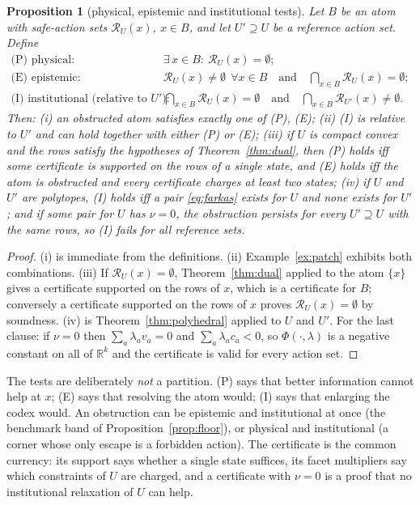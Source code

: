 \documentclass[11pt,a4paper]{article}
\theoremstyle{plain}
\newtheorem{proposition}[theorem]{Proposition}
\theoremstyle{definition}
\theoremstyle{remark}
\newcommand{\R}{\mathbb{R}}
\newcommand{\calR}{\mathcal{R}}
\begin{document}
\begin{proposition}[physical, epistemic and institutional tests]\label{prop:taxonomy}
Let $B$ be an atom with safe-action sets $\calR_U(x)$, $x\in B$, and let $U'\supseteq U$ be a reference action set. Define
\begin{align*}
\text{(P) physical:}\quad&\exists\,x\in B:\ \calR_U(x)=\emptyset;\\
\text{(E) epistemic:}\quad&\calR_U(x)\neq\emptyset\ \ \forall x\in B\quad\text{and}\quad\bigcap_{x\in B}\calR_U(x)=\emptyset;\\
\text{(I) institutional (relative to $U'$):}\quad&\bigcap_{x\in B}\calR_U(x)=\emptyset\quad\text{and}\quad\bigcap_{x\in B}\calR_{U'}(x)\neq\emptyset .
\end{align*}
Then: (i) an obstructed atom satisfies exactly one of (P), (E); (ii) (I) is relative to $U'$ and can hold together with either (P) or (E); (iii) if $U$ is compact convex and the rows satisfy the hypotheses of Theorem~\ref{thm:dual}, then (P) holds iff some certificate is supported on the rows of a single state, and (E) holds iff the atom is obstructed and every certificate charges at least two states; (iv) if $U$ and $U'$ are polytopes, (I) holds iff a pair \eqref{eq:farkas} exists for $U$ and none exists for $U'$; and if some pair for $U$ has $\nu=0$, the obstruction persists for every $U'\supseteq U$ with the same rows, so (I) fails for all reference sets.
\end{proposition}

\begin{proof}
(i) is immediate from the definitions. (ii) Example~\ref{ex:patch} exhibits both combinations. (iii) If $\calR_U(x)=\emptyset$, Theorem~\ref{thm:dual} applied to the atom $\{x\}$ gives a certificate supported on the rows of $x$, which is a certificate for $B$; conversely a certificate supported on the rows of $x$ proves $\calR_U(x)=\emptyset$ by soundness. (iv) is Theorem~\ref{thm:polyhedral} applied to $U$ and $U'$. For the last clause: if $\nu=0$ then $\sum_a\lambda_av_a=0$ and $\sum_a\lambda_ac_a<0$, so $\Phi(\cdot,\lambda)$ is a negative constant on all of $\R^k$ and the certificate is valid for every action set.
\end{proof}

The tests are deliberately \emph{not} a partition. (P) says that better information cannot help at $x$; (E) says that resolving the atom would; (I) says that enlarging the codex would. An obstruction can be epistemic and institutional at once (the benchmark band of Proposition~\ref{prop:floor}), or physical and institutional (a corner whose only escape is a forbidden action). The certificate is the common currency: its support says whether a single state suffices, its facet multipliers say which constraints of $U$ are charged, and a certificate with $\nu=0$ is a proof that no institutional relaxation of $U$ can help.
\end{document}
